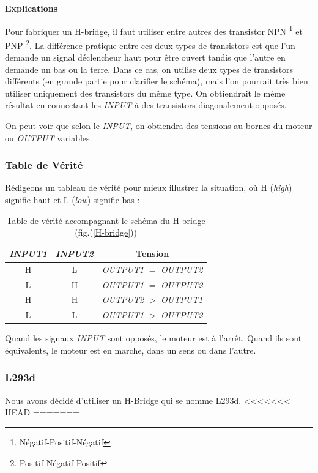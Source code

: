 \documentclass[a4paper,12pt]{report}
\begin{document}
{\textbf{Explications}

Pour fabriquer un H-bridge, il faut utiliser entre autres des transistor NPN \footnote{Négatif-Positif-Négatif} et PNP \footnote{Positif-Négatif-Positif}.  La diff\'erence pratique
entre ces deux types de transistors est que l'un demande un signal
d\'eclencheur haut pour \^etre ouvert tandis que l'autre en demande un
bas ou la terre. Dans ce cas, on utilise deux types de transistors
diff\'erents (en grande partie pour clarifier le sch\'ema), mais l'on pourrait
tr\`es bien utiliser uniquement des transistors du m\^eme type. On obtiendrait
le m\^eme r\'esultat en connectant les \emph{INPUT} \`a des transistors
diagonalement oppos\'es\cite{RobotRoom}.

On peut voir que selon le \emph{INPUT}, on obtiendra des tensions au bornes du
moteur ou \emph{OUTPUT} variables.
\subsubsection{Table de V\'erit\'e}
R\'edigeons un tableau de v\'erit\'e pour mieux illustrer la situation, o\`u H
(\textit{high}) signifie haut et L (\textit{low}) signifie bas :


\begin{table}%
\begin{center}
  \begin{tabular}{c|c||c}  
    \emph{INPUT1} & \emph{INPUT2}
    & Tension\\
    \hline
    H & L & \emph{OUTPUT1} $=$ \emph{OUTPUT2}\\
    L & H & \emph{OUTPUT1} $=$ \emph{OUTPUT2}\\
    H & H & \emph{OUTPUT2} $>$ \emph{OUTPUT1}\\
    L & L & \emph{OUTPUT1} $>$ \emph{OUTPUT2}\\
  \end{tabular}
\end{center}

\caption{\label{tableDeVerite} Table de v\'erit\'e accompagnant le sch\'ema du
H-bridge (fig.(\ref{H-bridge}))}

\small Quand les signaux \emph{INPUT} sont oppos\'es, le moteur est \`a
l'arr\^et. Quand ils sont \'equivalents, le moteur est en marche, dans un sens
ou dans l'autre.\normalsize
\end{table}

\subsubsection{L293d}
Nous avons décidé d'utiliser un H-Bridge qui se nomme L293d.
<<<<<<< HEAD
=======





}
\end{document}
